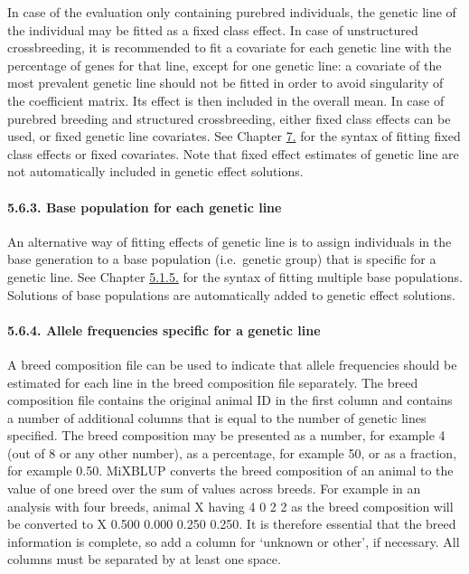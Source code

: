 In case of the evaluation only containing purebred individuals, the
genetic line of the individual may be fitted as a fixed class effect. In
case of unstructured crossbreeding, it is recommended to fit a covariate
for each genetic line with the percentage of genes for that line, except
for one genetic line: a covariate of the most prevalent genetic line
should not be fitted in order to avoid singularity of the coefficient
matrix. Its effect is then included in the overall mean. In case of
purebred breeding and structured crossbreeding, either fixed class
effects can be used, or fixed genetic line covariates. See Chapter
\hyperref[Stat01]{7.} for the syntax of fitting fixed class effects or
fixed covariates. Note that fixed effect estimates of genetic line are
not automatically included in genetic effect solutions.

\paragraph{5.6.3. Base population for each genetic line}\label{Gene61}

An alternative way of fitting effects of genetic line is to assign
individuals in the base generation to a base population (i.e.~genetic
group) that is specific for a genetic line. See Chapter
\hyperref[Gene13]{5.1.5.} for the syntax of fitting multiple base
populations. Solutions of base populations are automatically added to
genetic effect solutions.

\paragraph{5.6.4. Allele frequencies specific for a genetic
line}\label{Gene62}

A breed composition file can be used to indicate that allele frequencies
should be estimated for each line in the breed composition file
separately. The breed composition file contains the original animal ID
in the first column and contains a number of additional columns that is
equal to the number of genetic lines specified. The breed composition
may be presented as a number, for example 4 (out of 8 or any other
number), as a percentage, for example 50, or as a fraction, for example
0.50. MiXBLUP converts the breed composition of an animal to the value
of one breed over the sum of values across breeds. For example in an
analysis with four breeds, animal X having 4 0 2 2 as the breed
composition will be converted to X 0.500 0.000 0.250 0.250. It is
therefore essential that the breed information is complete, so add a
column for `unknown or other', if necessary. All columns must be
separated by at least one space.

